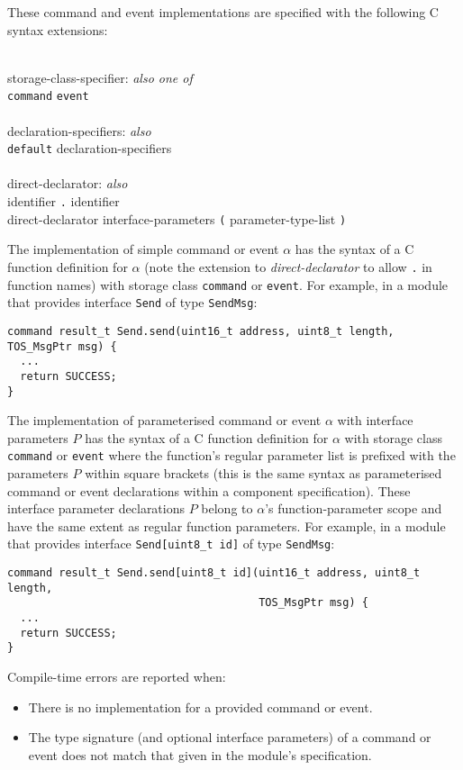 \documentclass[11pt]{article}
\newcommand{\kw}[1]{{\tt #1}}
\newcommand{\code}[1]{{\tt #1}}
\begin{document}
These command and event implementations are specified with the following C
syntax extensions:
\em \begin{tabbing}
\hspace*{2cm}\= \\ \kill
storage-class-specifier: \emph{also one of}\\
\>	\kw{command} \kw{event}\\
\\
declaration-specifiers: \emph{also}\\
\>	\kw{default} declaration-specifiers\\
\\
direct-declarator: \emph{also}\\
\>	identifier \kw{.} identifier \\
\>	direct-declarator interface-parameters \kw{(} parameter-type-list \kw{)}\\
\end{tabbing} \rm
The implementation of simple command or event $\alpha$ has the syntax of a C
function definition for $\alpha$ (note the extension to
\emph{direct-declarator} to allow \code{.} in function names) with storage
class \kw{command} or \kw{event}. For example, in a module that provides
interface \code{Send} of type \kw{SendMsg}:
\begin{verbatim}
command result_t Send.send(uint16_t address, uint8_t length, TOS_MsgPtr msg) {
  ...
  return SUCCESS;
}
\end{verbatim}

The implementation of parameterised command or event $\alpha$ with interface
parameters $P$ has the syntax of a C function definition for $\alpha$ with
storage class \kw{command} or \kw{event} where the function's regular
parameter list is prefixed with the parameters $P$ within square brackets
(this is the same syntax as parameterised command or event declarations
within a component specification). These interface parameter declarations
$P$ belong to $\alpha$'s function-parameter scope and have the same extent
as regular function parameters. For example, in a module that provides
interface \code{Send[uint8\_t id]} of type \kw{SendMsg}:
\begin{verbatim}
command result_t Send.send[uint8_t id](uint16_t address, uint8_t length, 
                                       TOS_MsgPtr msg) {
  ...
  return SUCCESS;
}
\end{verbatim}

Compile-time errors are reported when:
\begin{itemize}
\item There is no implementation for a provided command or event.
\item The type signature (and optional interface parameters) of a command or
event does not match that given in the module's specification.
\end{itemize}
\end{document}
